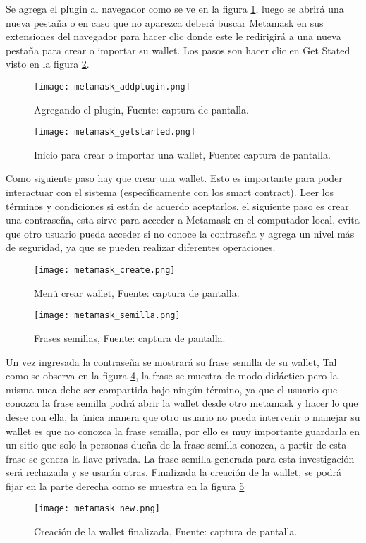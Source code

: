 Se agrega el plugin al navegador como se ve en la figura \ref{img:metamask_add}, luego
se abrirá una nueva pestaña o en caso que no aparezca deberá buscar Metamask en sus extensiones del navegador 
para hacer clic donde este le redirigirá a una nueva pestaña para crear o importar su wallet.
Los pasos son hacer clic en Get Stated visto en la figura \ref{img:metamask_getstarted}.



\begin{figure}[H]
  \centering
  {\texttt{[image: metamask\_addplugin.png]}}
  \caption{Agregando el plugin, Fuente: captura de pantalla. }
  \label{img:metamask_add}
\end{figure}

\begin{figure}[H]
  \centering
  {\texttt{[image: metamask\_getstarted.png]}}
  \caption{Inicio para crear o importar una wallet, Fuente: captura de pantalla.}
  \label{img:metamask_getstarted}
\end{figure}

Como siguiente paso hay que crear una wallet. Esto es importante para poder interactuar con el sistema
(específicamente con los smart contract). Leer los términos y condiciones si están de acuerdo aceptarlos,
el siguiente paso es crear una contraseña, esta sirve para acceder a Metamask en el computador local, evita que otro usuario pueda acceder si no conoce la contraseña y agrega un nivel más de seguridad, ya que  se pueden realizar diferentes operaciones.

\begin{figure}[H]
  \centering
  {\texttt{[image: metamask\_create.png]}}
  \caption{Menú crear wallet,  Fuente: captura de pantalla. }
  \label{img:metamask_create}
\end{figure}

\begin{figure}[H]
  \centering
  {\texttt{[image: metamask\_semilla.png]}}
  \caption{Frases semillas,  Fuente: captura de pantalla. }
  \label{img:metamask_semilla}
\end{figure}

Un vez ingresada la contraseña se mostrará su frase semilla de su wallet, 
Tal como se observa en la figura \ref{img:metamask_semilla}, la frase se muestra de modo didáctico 
pero la misma nuca debe ser compartida bajo ningún término, ya que el usuario
que conozca la frase semilla podrá abrir la wallet desde otro metamask y hacer lo que desee con ella,
la única manera que otro usuario no pueda intervenir o manejar su wallet es que no conozca la frase semilla, 
por ello es muy importante guardarla en un sitio que solo la personas dueña de la frase semilla conozca,  
a partir de esta frase se genera la llave privada.
La frase semilla generada para esta investigación será rechazada y se usarán otras.
Finalizada la creación de la wallet, se podrá fijar en la parte derecha como se muestra en la figura \ref{img:metamask_new}
\begin{figure}[H]
  \centering
  {\texttt{[image: metamask\_new.png]}}
  \caption{Creación de la wallet finalizada,  Fuente: captura de pantalla. }
  \label{img:metamask_new}
\end{figure}



